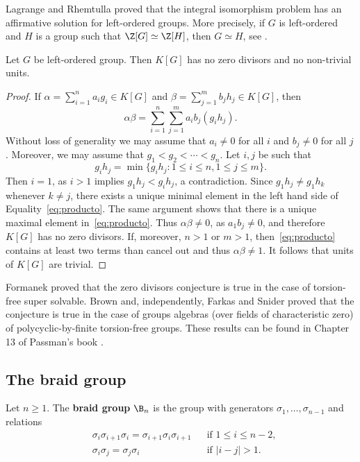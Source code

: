Lagrange and Rhemtulla proved that the integral isomorphism problem 
has an affirmative solution for left-ordered groups. More precisely,
if $G$ is left-ordered and $H$ is a group such that $\Z[G]\simeq\Z[H]$, then
$G\simeq H$, see \cite{MR240183}.

\begin{theorem}
	Let $G$ be left-ordered group. Then $K[G]$ has no zero divisors 
	and no non-trivial units. 
\end{theorem}

\begin{proof}
	If $\alpha=\sum_{i=1}^na_ig_i\in K[G]$ and
	$\beta=\sum_{j=1}^mb_jh_j\in K[G]$, then 
	\begin{equation}
		\label{eq:producto}
		\alpha\beta=\sum_{i=1}^n\sum_{j=1}^ma_ib_j(g_ih_j).
	\end{equation}
	Without loss of generality we may assume that $a_i\ne 0$ for
	all $i$ and $b_j\ne 0$ for all $j$. Moreover, we may assume that 
	$g_1<g_2<\cdots<g_n$. Let $i,j$ be such that 
	\[
		g_ih_j=\min\{g_ih_j:1\leq i\leq n,1\leq j\leq m\}.
	\]
	Then $i=1$, as $i>1$ implies
	$g_1h_j<g_ih_j$, a contradiction. Since $g_1h_j\ne g_1h_k$ whenever 
	$k\ne j$, there exists a unique minimal element in the left hand side of Equality~\eqref{eq:producto}. The same argument shows that there is a unique
	maximal element in~\eqref{eq:producto}. Thus 
	$\alpha\beta\ne 0$, as $a_1b_j\ne 0$, and therefore $K[G]$ has no zero divisors. 
	If, moreover, $n>1$ or $m>1$, then~\eqref{eq:producto} contains at least two
	terms than cancel out and thus  
	$\alpha\beta\ne1$. It follows that units of $K[G]$ are trivial. 
\end{proof}

Formanek proved that the zero divisors conjecture is true 
in the case of torsion-free super solvable. Brown and, independently, 
Farkas and Snider proved that the conjecture is true 
in the case of groups algebras (over fields of characteristic zero) of 
polycyclic-by-finite torsion-free groups. These results
can be found in Chapter 13 of
Passman's book \cite{MR798076}. 

\subsection{The braid group}

\begin{definition}
    Let $n\geq1$. The \textbf{braid group} $\B_n$ is
    the group with generators $\sigma_1,\dots,\sigma_{n-1}$ and
    relations
    \begin{align*}
        &\sigma_i\sigma_{i+1}\sigma_i=\sigma_{i+1}\sigma_i\sigma_{i+1} && \text{if }1\leq i\leq n-2,\\
        &\sigma_i\sigma_j=\sigma_j\sigma_i && \text{if }|i-j|> 1.
    \end{align*}
\end{definition}

